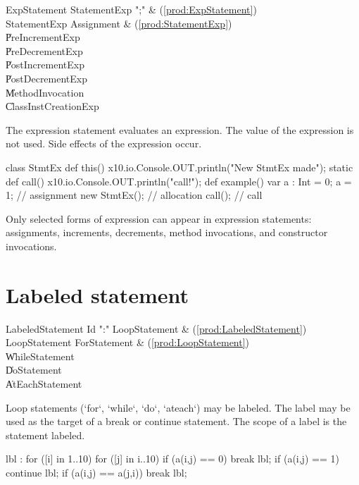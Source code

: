 \begin{bbgrammar}
 ExpStatement    \: StatementExp \xcd";" & (\ref{prod:ExpStatement})\\%
 StatementExp    \: Assignment & (\ref{prod:StatementExp})\\%
    \| PreIncrementExp\\
    \| PreDecrementExp\\
    \| PostIncrementExp\\
    \| PostDecrementExp\\
    \| MethodInvocation\\
    \| ClassInstCreationExp\\

\end{bbgrammar}


The expression statement evaluates an expression.  The value of the expression
is not used.
Side effects of the expression occur.  
\begin{xten}
class StmtEx {
  def this() { x10.io.Console.OUT.println("New StmtEx made");  }
  static def call() { x10.io.Console.OUT.println("call!");  }
  def example() {
     var a : Int = 0;
     a = 1; // assignment
     new StmtEx(); // allocation
     call(); // call
  }
}
\end{xten}
%
Only selected forms of expression can appear in expression
statements: assignments, increments, decrements, method invocations, and
constructor invocations. 


\section{Labeled statement}

\begin{bbgrammar}
 LabeledStatement    \: Id \xcd":" LoopStatement & (\ref{prod:LabeledStatement})\\%
 LoopStatement    \: ForStatement & (\ref{prod:LoopStatement})\\%
    \| WhileStatement\\
    \| DoStatement\\
    \| AtEachStatement\\
\end{bbgrammar}


Loop statements (\xcd`for`, \xcd`while`, \xcd`do`, \xcd`ateach`) may be labeled. The label may be used as the target of a break
or continue statement. The scope of a label is the statement labeled.
\begin{xten}
lbl : for ([i] in 1..10) {
   for ([j] in i..10) {  
      if (a(i,j) == 0) break lbl;
      if (a(i,j) == 1) continue lbl;
      if (a(i,j) == a(j,i)) break lbl;
   }
}
\end{xten}


